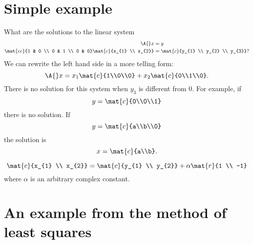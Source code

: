 \section{Simple example}
What are the solutions to the linear system
\begin{equation}
  \begin{split}
    \A{}x &= y \\
    \mat{cc}{1 & 0 \\ 0 & 1 \\ 0 & 0}
    \mat{c}{x_{1} \\ x_{2}} &=
    \mat{c}{y_{1} \\ y_{2} \\ y_{3}}?
  \end{split}
\end{equation}
We can rewrite the left hand side in a more telling form:
\begin{equation}
  \A{}x = x_{1} \mat{c}{1\\0\\0} + x_{2} \mat{c}{0\\1\\0}.
\end{equation}
There is no solution for this system when $y_{3}$ is different from 0. For example, if
\begin{equation}
  y = \mat{c}{0\\0\\1}
\end{equation}
there is no solution. If
\begin{equation}
  y = \mat{c}{a\\b\\0}
\end{equation}
the solution is 
\begin{equation}
  x = \mat{c}{a\\b}.
\end{equation}


\begin{equation}
  \mat{c}{x_{1} \\ x_{2}} = \mat{c}{y_{1} \\ y_{2}} + \alpha \mat{r}{1 \\ -1}
\end{equation}
where $\alpha$ is an arbitrary complex constant.



\section{An example from the method of least squares}

